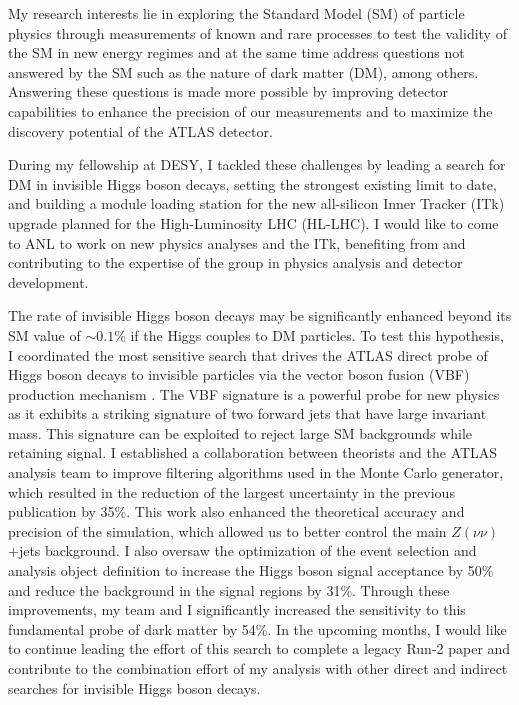 \documentclass[a4paper]{article}
\begin{document}
\thispagestyle{fancy} 
 \lfoot{} \rfoot{\bf \thepage} \cfoot{}

\fontsize{11}{14}
\selectfont


My research interests lie in exploring the Standard Model (SM) of particle physics through measurements of known and rare processes
to test the validity of the SM in new energy regimes and at the same time address questions not answered by the SM such as the nature of
dark matter (DM), among others.
Answering these questions is made more possible by improving detector capabilities to enhance the precision of our measurements and to maximize the discovery potential of the ATLAS detector.

During my fellowship at DESY, I tackled these challenges by leading a search for DM in invisible Higgs boson decays, setting the strongest existing limit to date, and building a module loading station for the new all-silicon Inner Tracker (ITk) upgrade planned for the High-Luminosity LHC (HL-LHC). I would like to come to ANL to work on new physics analyses and the ITk, benefiting from and contributing to the expertise of the group in physics analysis and detector development.

The rate of invisible Higgs boson decays may be significantly enhanced beyond its SM value of $\sim0.1\%$ if the Higgs couples to DM particles.
To test this hypothesis, I coordinated the most sensitive search that drives the ATLAS direct probe of Higgs boson decays to invisible particles via the vector boson fusion (VBF) production mechanism \cite{vbfMET_CONF2020}. The VBF signature is a powerful probe for new physics as it exhibits a striking signature of two forward jets that have large invariant mass. This signature can be exploited to reject large SM backgrounds while retaining signal.
I established a collaboration between theorists and the ATLAS analysis team to improve
filtering algorithms used in the Monte Carlo generator, which resulted in the reduction of the largest uncertainty in the previous publication by 35\%. This work also enhanced the theoretical accuracy and precision of the simulation, which allowed us to better control the main $Z\left(\nu\nu\right)$+jets background.
I also oversaw the optimization of the event selection and analysis object definition to increase the Higgs boson signal acceptance by 50\% and reduce the background in the signal regions by 31\%. Through these improvements, my team and I significantly increased the sensitivity to this fundamental probe of dark matter by 54\%. In the upcoming months, I would like to continue leading the effort of this search to complete a
legacy Run-2 paper and contribute to the combination effort of my analysis with other direct and indirect searches for invisible Higgs boson decays.
\end{document}
